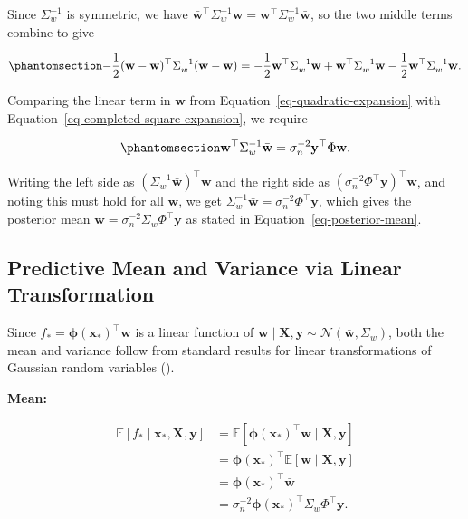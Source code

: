 \documentclass[
  letterpaper,
  DIV=11,
  numbers=noendperiod]{scrartcl}
\begin{document}
Since \(\Sigma_w^{-1}\) is symmetric, we have
\(\bar{\mathbf{w}}^\top \Sigma_w^{-1} \mathbf{w} = \mathbf{w}^\top \Sigma_w^{-1} \bar{\mathbf{w}}\),
so the two middle terms combine to give

\begin{equation}\phantomsection\label{eq-completed-square-expansion}{
-\frac{1}{2}(\mathbf{w} - \bar{\mathbf{w}})^\top \Sigma_w^{-1} (\mathbf{w} - \bar{\mathbf{w}}) = -\frac{1}{2}\mathbf{w}^\top \Sigma_w^{-1} \mathbf{w} + \mathbf{w}^\top \Sigma_w^{-1} \bar{\mathbf{w}} - \frac{1}{2}\bar{\mathbf{w}}^\top \Sigma_w^{-1} \bar{\mathbf{w}}.
}\end{equation}

Comparing the linear term in \(\mathbf{w}\) from
Equation~\ref{eq-quadratic-expansion} with
Equation~\ref{eq-completed-square-expansion}, we require

\begin{equation}\phantomsection\label{eq-linear-term-match}{
\mathbf{w}^\top \Sigma_w^{-1} \bar{\mathbf{w}} = \sigma_n^{-2}\mathbf{y}^\top \Phi \mathbf{w}.
}\end{equation}

Writing the left side as
\((\Sigma_w^{-1} \bar{\mathbf{w}})^\top \mathbf{w}\) and the right side
as \((\sigma_n^{-2}\Phi^\top \mathbf{y})^\top \mathbf{w}\), and noting
this must hold for all \(\mathbf{w}\), we get
\(\Sigma_w^{-1} \bar{\mathbf{w}} = \sigma_n^{-2}\Phi^\top \mathbf{y}\),
which gives the posterior mean
\(\bar{\mathbf{w}} = \sigma_n^{-2} \Sigma_w \Phi^\top \mathbf{y}\) as
stated in Equation~\ref{eq-posterior-mean}.

\subsection{Predictive Mean and Variance via Linear
Transformation}\label{sec-predictive-variance}

Since \(f_* = \boldsymbol{\phi}(\mathbf{x}_*)^\top \mathbf{w}\) is a
linear function of
\(\mathbf{w} \mid \mathbf{X}, \mathbf{y} \sim \mathcal{N}(\bar{\mathbf{w}}, \Sigma_w)\),
both the mean and variance follow from standard results for linear
transformations of Gaussian random variables
().

\textbf{Mean:}

\[
\begin{aligned}
\mathbb{E}[f_* \mid \mathbf{x}_*, \mathbf{X}, \mathbf{y}] &= \mathbb{E}[\boldsymbol{\phi}(\mathbf{x}_*)^\top \mathbf{w} \mid \mathbf{X}, \mathbf{y}] \\
&= \boldsymbol{\phi}(\mathbf{x}_*)^\top \mathbb{E}[\mathbf{w} \mid \mathbf{X}, \mathbf{y}] \\
&= \boldsymbol{\phi}(\mathbf{x}_*)^\top \bar{\mathbf{w}} \\
&= \sigma_n^{-2} \boldsymbol{\phi}(\mathbf{x}_*)^\top \Sigma_w \Phi^\top \mathbf{y}.
\end{aligned}
\]
\end{document}
